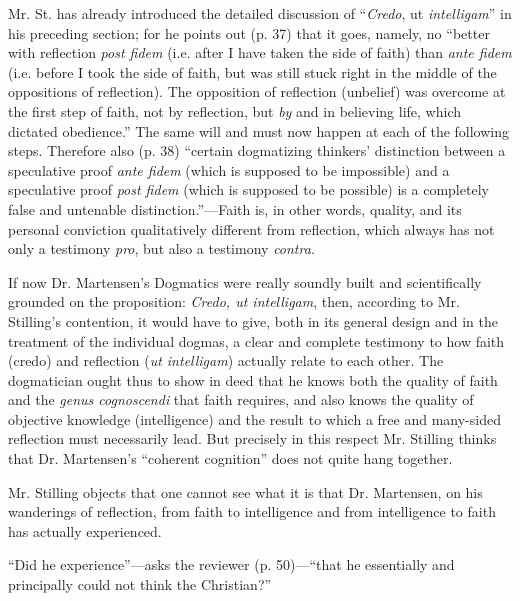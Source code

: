 \documentclass[12pt,a4paper,openany]{book}
\newcommand{\opage}[1]{\marginnote{\footnotesize\textit{[#1]}}}
\begin{document}
Mr. St. has already introduced the detailed discussion of ``\textit{Credo}, ut \textit{intelligam}''
in his preceding section; for
he points out (p. 37) that it goes, namely, no
``better with reflection \textit{post fidem} (i.e. after I have
\setcounter{footnote}{0}%
\opage{20}taken the side of faith) than \textit{ante fidem} (i.e. before I took the side of faith,
but was still stuck right in the middle of the oppositions of reflection).
The opposition of reflection (unbelief) was overcome at the first
step of faith, not by reflection, but \emph{by} and
in believing life, which dictated obedience.'' The same
will and must now happen at each of the following steps.
Therefore also (p. 38) ``certain dogmatizing thinkers'
distinction between a speculative proof \textit{ante fidem}
(which is supposed to be impossible) and a speculative proof \textit{post fidem}
(which is supposed to be possible) is a completely false and untenable
distinction.''---Faith is, in other words, quality, and
its personal conviction qualitatively different from reflection,
which always has not only a testimony \textit{pro}, but
also a testimony \textit{contra}.

If now Dr. Martensen's Dogmatics were really soundly
built and scientifically grounded on the proposition:
\textit{Credo, ut intelligam}, then, according to Mr. Stilling's
contention, it would have to give, both in its general design and in the treatment
of the individual dogmas, a clear and complete
testimony to how faith (credo) and reflection
(\textit{ut intelligam}) actually relate to each other. The dogmatician
ought thus to show in deed that he knows both
the quality of faith and the \textit{genus cognoscendi} that faith
requires, and also knows the quality of objective knowledge (intelligence)
and the result to which a free and many-sided
reflection must necessarily lead. But precisely in this respect
Mr. Stilling thinks that Dr. Martensen's ``coherent cognition''
does not quite hang together.

Mr. Stilling objects that one cannot see
what it is that Dr. Martensen, on his wanderings of reflection, from
\setcounter{footnote}{0}%
\opage{21}faith to intelligence and from intelligence to faith has actually
experienced.

``Did he experience''---asks the reviewer (p. 50)---``that
he essentially and principally could not think the Christian?''
\end{document}

